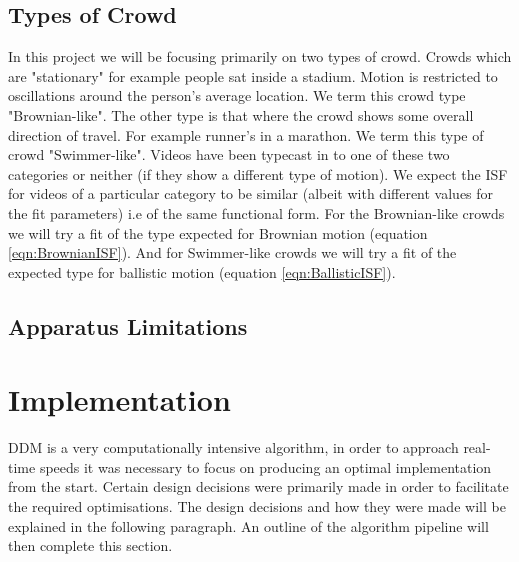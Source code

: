 \documentclass[11pt]{article}
\begin{document}
\subsection{Types of Crowd}
\label{section:crowdtypes}
In this project we will be focusing primarily on two types of crowd. Crowds which are "stationary" for example people sat inside a stadium. Motion is restricted to oscillations around the person's average location. We term this crowd type "Brownian-like". The other type is that where the crowd shows some overall direction of travel. For example runner's in a marathon. We term this type of crowd "Swimmer-like". Videos have been typecast in to one of these two categories or neither (if they show a different type of motion). We expect the ISF for videos of a particular category to be similar (albeit with different values for the fit parameters) i.e of the same functional form. For the Brownian-like crowds we will try a fit of the type expected for Brownian motion (equation \ref{eqn:BrownianISF}). And for Swimmer-like crowds we will try a fit of the expected type for ballistic motion (equation \ref{eqn:BallisticISF}).

\subsection{Apparatus Limitations}
\label{section:fitting_issues}

\clearpage
\section{Implementation}

DDM is a very computationally intensive algorithm, in order to approach real-time speeds it was necessary to focus on producing an optimal implementation from the start. Certain design decisions were primarily made in order to facilitate the required optimisations. The design decisions and how they were made will be explained in the following paragraph. An outline of the algorithm pipeline will then complete this section.
\\\\
\end{document}
